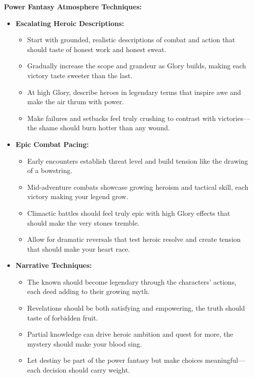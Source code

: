 \documentclass[11pt]{article}
\begin{document}
\textbf{Power Fantasy Atmosphere Techniques:}
\begin{itemize}
\item \textbf{Escalating Heroic Descriptions:}
  \begin{itemize}
  \item Start with grounded, realistic descriptions of combat and action that should taste of honest work and honest sweat.
  \item Gradually increase the scope and grandeur as Glory builds, making each victory taste sweeter than the last.
  \item At high Glory, describe heroes in legendary terms that inspire awe and make the air thrum with power.
  \item Make failures and setbacks feel truly crushing to contrast with victories—the shame should burn hotter than any wound.
  \end{itemize}
\item \textbf{Epic Combat Pacing:}
  \begin{itemize}
  \item Early encounters establish threat level and build tension like the drawing of a bowstring.
  \item Mid-adventure combats showcase growing heroism and tactical skill, each victory making your legend grow.
  \item Climactic battles should feel truly epic with high Glory effects that should make the very stones tremble.
  \item Allow for dramatic reversals that test heroic resolve and create tension that should make your heart race.
  \end{itemize}
\item \textbf{Narrative Techniques:}
  \begin{itemize}
  \item The known should become legendary through the characters' actions, each deed adding to their growing myth.
  \item Revelations should be both satisfying and empowering, the truth should taste of forbidden fruit.
  \item Partial knowledge can drive heroic ambition and quest for more, the mystery should make your blood sing.
  \item Let destiny be part of the power fantasy but make choices meaningful—each decision should carry weight.
  \end{itemize}
\end{itemize}
\end{document}
